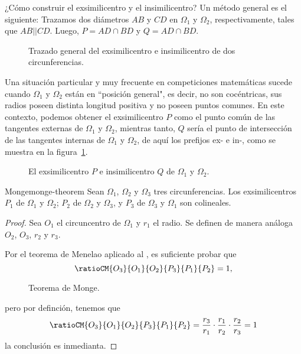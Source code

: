 ¿Cómo construir el exsimilicentro y el insimilicentro?
Un método general es el siguiente: Trazamos dos diámetros $AB$ y $CD$ en $\Omega_1$ y $\Omega_2$, respectivamente, tales que $AB || CD$.
Luego, $P = AD \cap BD$ y $Q = AD \cap BD$.

\begin{figure}[H]
    \centering
    
    \caption{Trazado general del exsimilicentro e insimilicentro de dos circunferencias.}
\end{figure}

Una situación particular y muy frecuente en competiciones matemáticas sucede cuando $\Omega_1$ y $\Omega_2$ están en ``posición general", es decir, no son cocéntricas, sus radios poseen distinta longitud positiva y no poseen puntos comunes.
En este contexto, podemos obtener el exsimilicentro $P$ como el punto común de las tangentes externas de $\Omega_1$ y $\Omega_2$, mientras tanto, $Q$ sería el punto de intersección de las tangentes internas de $\Omega_1$ y $\Omega_2$, de aquí los prefijos ex- e in-, como se muestra en la figura~\ref{fig:ex-in-similaricenter}.

\begin{figure}[H]
    \centering
    
    \caption{El exsimilicentro $P$ e insimilicentro $Q$ de $\Omega_1$ y $\Omega_2$.}
    \label{fig:ex-in-similaricenter}
\end{figure}

\begin{section-theorem.tcb}{Monge}{monge-theorem}
    Sean $\Omega_1$, $\Omega_2$ y $\Omega_3$ tres circunferencias.
    Los exsimilicentros $P_1$ de $\Omega_1$ y $\Omega_2$; $P_2$ de $\Omega_2$ y $\Omega_3$, y $P_3$ de $\Omega_3$ y $\Omega_1$ son colineales.
\end{section-theorem.tcb}

\begin{proof}
    Sea $O_1$ el circuncentro de $\Omega_1$ y $r_1$ el radio.
    Se definen de manera análoga $O_2$, $O_3$, $r_2$ y $r_3$.

    Por el teorema de Menelao aplicado al , es suficiente probar que
    \[
        \ratioCM{O_3}{O_1}{O_2}{P_3}{P_1}{P_2} = 1,
    \]
    \begin{figure}[H]
        \centering
        
        \caption{Teorema de Monge.}
    \end{figure}
    pero por definción, tenemos que
    \[
        \ratioCM{O_3}{O_1}{O_2}{P_3}{P_1}{P_2} = \dfrac{r_3}{r_1} \cdot \dfrac{r_1}{r_2} \cdot \dfrac{r_2}{r_3} = 1
    \]
    la conclusión es inmedianta. \qedhere
\end{proof}



